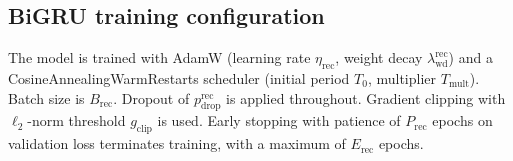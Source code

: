 \documentclass[a4paper,fleqn]{cas-dc}
\begin{document}
\subsection{BiGRU training configuration}

The model is trained with AdamW (learning rate $\eta_{\text{rec}}$, weight decay $\lambda_{\text{wd}}^{\text{rec}}$) and a CosineAnnealingWarmRestarts scheduler (initial period $T_0$, multiplier $T_{\text{mult}}$). Batch size is $B_{\text{rec}}$. Dropout of $p_{\text{drop}}^{\text{rec}}$ is applied throughout. Gradient clipping with $\ell_2$-norm threshold $g_{\text{clip}}$ is used. Early stopping with patience of $P_{\text{rec}}$ epochs on validation loss terminates training, with a maximum of $E_{\text{rec}}$ epochs.
\end{document}
